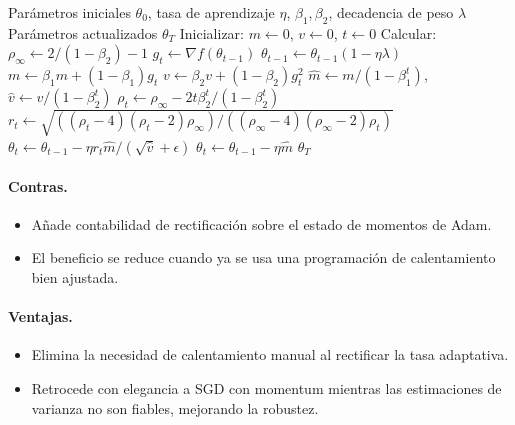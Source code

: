 \begin{algorithm}[H]
\caption{RAdam (Adam Rectificado)}
\label{alg:radam}
\begin{algorithmic}[1]
\Require Parámetros iniciales $\theta_0$, tasa de aprendizaje $\eta$, $\beta_1, \beta_2$, decadencia de peso $\lambda$
\Ensure Parámetros actualizados $\theta_T$
\State Inicializar: $m \gets 0$, $v \gets 0$, $t \gets 0$
\State Calcular: $\rho_\infty \gets 2/(1-\beta_2) - 1$
    \State $g_t \gets \nabla f(\theta_{t-1})$
        \State $\theta_{t-1} \gets \theta_{t-1}(1 - \eta\lambda)$
    \EndIf
    \State $m \gets \beta_1 m + (1-\beta_1) g_t$
    \State $v \gets \beta_2 v + (1-\beta_2) g_t^2$
    \State $\hat{m} \gets m/(1-\beta_1^t)$, $\hat{v} \gets v/(1-\beta_2^t)$
    \State $\rho_t \gets \rho_\infty - 2t \beta_2^t / (1 - \beta_2^t)$
        \State $r_t \gets \sqrt{((\rho_t-4)(\rho_t-2)\rho_\infty) / ((\rho_\infty-4)(\rho_\infty-2)\rho_t)}$
        \State $\theta_t \gets \theta_{t-1} - \eta r_t \hat{m} / (\sqrt{\hat{v}} + \epsilon)$
    \Else
        \State $\theta_t \gets \theta_{t-1} - \eta \hat{m}$ 
    \EndIf
\EndFor
\Return $\theta_T$
\end{algorithmic}
\end{algorithm}

\paragraph{Contras.}
\begin{itemize}[leftmargin=*]
\item Añade contabilidad de rectificación sobre el estado de momentos de Adam.
\item El beneficio se reduce cuando ya se usa una programación de calentamiento bien ajustada.
\end{itemize}

\paragraph{Ventajas.}
\begin{itemize}[leftmargin=*]
\item Elimina la necesidad de calentamiento manual al rectificar la tasa adaptativa.
\item Retrocede con elegancia a SGD con momentum mientras las estimaciones de varianza no son fiables, mejorando la robustez.
\end{itemize}

